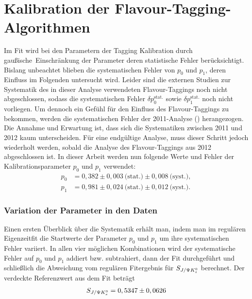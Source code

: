 \section{Kalibration der Flavour-Tagging-Algorithmen}
Im Fit wird bei den Parametern der Tagging Kalibration durch \glqq gaußische\grqq\ Einschränkung der Parameter deren statistische Fehler berücksichtigt. Bislang unbeachtet blieben die systematischen Fehler von $p_0$ und $p_1$, deren Einfluss im Folgenden untersucht wird. Leider sind die externen Studien zur Systematik des in dieser Analyse verwendeten Flavour-Taggings noch nicht abgeschlossen, sodass die systematischen Fehler $\delta p_0^{\text{stat.}}$ sowie $\delta p_1^{\text{stat.}}$ noch nicht vorliegen. Um dennoch ein Gefühl für den Einfluss des Flavour-Taggings zu bekommen, werden die systematischen Fehler der 2011-Analyse (\cite{lhcb-paper}) herangezogen. Die Annahme und Erwartung ist, dass sich die Systematiken zwischen 2011 und 2012 kaum unterscheiden. Für eine endgültige Analyse, muss dieser Schritt jedoch wiederholt werden, sobald die Analyse des Flavour-Taggings aus 2012 abgeschlossen ist. In dieser Arbeit werden nun folgende Werte und Fehler der Kalibrationsparameter $p_0$ und $p_1$ verwendet:
\begin{align}
p_0 &= 0,382 \pm 0,003\ \text{(stat.)} \pm 0,008\ \text{(syst.)}, \\
p_1 &= 0,981 \pm 0,024\ \text{(stat.)} \pm 0,012\ \text{(syst.)}.
\end{align}

\subsubsection{Variation der Parameter in den Daten}
Einen ersten Überblick über die Systematik erhält man, indem man
im regulären Eigenzeitfit die Startwerte der Parameter $p_0$ und $p_1$ um ihre systematischen Fehler variiert. In allen vier möglichen Kombinationen wird der systematische Fehler auf $p_0$ und $p_1$ addiert bzw. subtrahiert, dann der Fit durchgeführt und schließlich die Abweichung vom regulären Fitergebnis für $S_{J/\Psi K_s^0}$ berechnet. Der verdeckte Referenzwert aus dem Fit beträgt
\begin{align}
S_{J/\Psi K_s^0} = 0,5347 \pm 0,0626 
\end{align}

